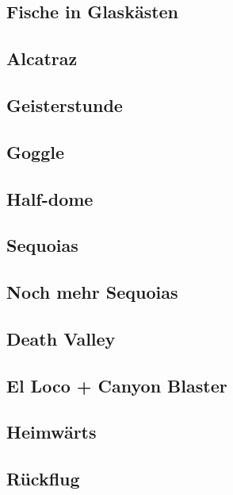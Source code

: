 \documentclass[twoside]{scrartcl}
\begin{document}
\subsection*{Fische in Glaskästen}


\subsection*{Alcatraz}


\subsection*{Geisterstunde}


\subsection*{Goggle}


\subsection*{Half-dome}


\subsection*{Sequoias}


\subsection*{Noch mehr Sequoias}


\subsection*{Death Valley}


\subsection*{El Loco + Canyon Blaster}


\subsection*{Heimwärts}


\subsection*{Rückflug}

\end{document}
